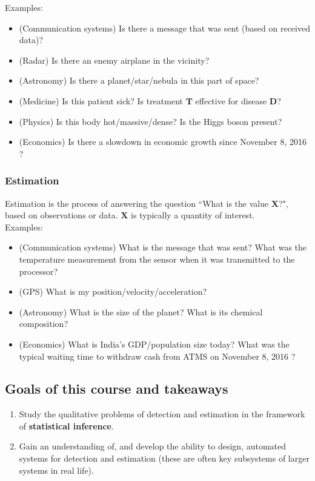 \documentclass[12pt]{report}
\begin{document}
\noindent Examples:
\begin{itemize}
\item (Communication systems) Is there a message that was sent (based on received data)?
\item (Radar) Is there an enemy airplane in the vicinity?
\item (Astronomy) Is there a planet/star/nebula in this part of space?
\item (Medicine) Is this patient sick? Is treatment $\mathbf{T}$ effective for disease $\mathbf{D}$?
\item (Physics) Is this body hot/massive/dense? Is the Higgs boson present?
\item (Economics) Is there a slowdown in economic growth since November 8, 2016 \cite{Hin16:demonetization}?
\end{itemize}

\subsubsection{Estimation}
Estimation is the process of answering the question ``What is the value $\mathbf{X}$?", based on observations or data. $\mathbf{X}$ is typically a quantity of interest. \\

\noindent Examples:
\begin{itemize}
\item (Communication systems) What is the message that was sent? What was the temperature measurement from the sensor when it was transmitted to the processor?
\item (GPS) What is my position/velocity/acceleration?
\item (Astronomy) What is the size of the planet? What is its chemical composition?
\item (Economics) What is India's GDP/population size today? What was the typical waiting time to withdraw cash from ATMS on November 8, 2016 \cite{Hin16:demonetization}?
\end{itemize}

\subsection{Goals of this course and takeaways}
\begin{enumerate}
\item Study the qualitative problems of detection and estimation in the framework of {\bf statistical inference}.
\item Gain an understanding of, and develop the ability to design, automated systems for detection and estimation (these are often key subsystems of larger systems in real life). 
\end{enumerate}
\end{document}
